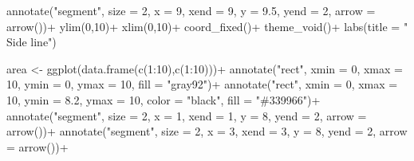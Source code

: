 \documentclass[
  letterpaper,
]{book}
\newenvironment{Shaded}{\begin{snugshade}}{\end{snugshade}}
\newcommand{\AttributeTok}[1]{\textcolor[rgb]{0.40,0.45,0.13}{#1}}
\newcommand{\DecValTok}[1]{\textcolor[rgb]{0.68,0.00,0.00}{#1}}
\newcommand{\FloatTok}[1]{\textcolor[rgb]{0.68,0.00,0.00}{#1}}
\newcommand{\FunctionTok}[1]{\textcolor[rgb]{0.28,0.35,0.67}{#1}}
\newcommand{\NormalTok}[1]{\textcolor[rgb]{0.00,0.23,0.31}{#1}}
\newcommand{\OtherTok}[1]{\textcolor[rgb]{0.00,0.23,0.31}{#1}}
\newcommand{\SpecialCharTok}[1]{\textcolor[rgb]{0.37,0.37,0.37}{#1}}
\newcommand{\StringTok}[1]{\textcolor[rgb]{0.13,0.47,0.30}{#1}}
\begin{document}
\begin{Shaded}
\begin{Highlighting}[]
  \FunctionTok{annotate}\NormalTok{(}\StringTok{"segment"}\NormalTok{, }\AttributeTok{size =} \DecValTok{2}\NormalTok{, }\AttributeTok{x =} \DecValTok{9}\NormalTok{, }\AttributeTok{xend =} \DecValTok{9}\NormalTok{, }\AttributeTok{y =} \FloatTok{9.5}\NormalTok{, }\AttributeTok{yend =} \DecValTok{2}\NormalTok{, }\AttributeTok{arrow =} \FunctionTok{arrow}\NormalTok{())}\SpecialCharTok{+}
  \FunctionTok{ylim}\NormalTok{(}\DecValTok{0}\NormalTok{,}\DecValTok{10}\NormalTok{)}\SpecialCharTok{+}
  \FunctionTok{xlim}\NormalTok{(}\DecValTok{0}\NormalTok{,}\DecValTok{10}\NormalTok{)}\SpecialCharTok{+}
  \FunctionTok{coord\_fixed}\NormalTok{()}\SpecialCharTok{+}
  \FunctionTok{theme\_void}\NormalTok{()}\SpecialCharTok{+}
  \FunctionTok{labs}\NormalTok{(}\AttributeTok{title =} \StringTok{"      Side line"}\NormalTok{)}

\NormalTok{area }\OtherTok{\textless{}{-}} \FunctionTok{ggplot}\NormalTok{(}\FunctionTok{data.frame}\NormalTok{(}\FunctionTok{c}\NormalTok{(}\DecValTok{1}\SpecialCharTok{:}\DecValTok{10}\NormalTok{),}\FunctionTok{c}\NormalTok{(}\DecValTok{1}\SpecialCharTok{:}\DecValTok{10}\NormalTok{)))}\SpecialCharTok{+}
  \FunctionTok{annotate}\NormalTok{(}\StringTok{"rect"}\NormalTok{, }\AttributeTok{xmin =} \DecValTok{0}\NormalTok{, }\AttributeTok{xmax =} \DecValTok{10}\NormalTok{, }\AttributeTok{ymin =} \DecValTok{0}\NormalTok{, }\AttributeTok{ymax =} \DecValTok{10}\NormalTok{, }\AttributeTok{fill =} \StringTok{"gray92"}\NormalTok{)}\SpecialCharTok{+}
  \FunctionTok{annotate}\NormalTok{(}\StringTok{"rect"}\NormalTok{, }\AttributeTok{xmin =} \DecValTok{0}\NormalTok{, }\AttributeTok{xmax =} \DecValTok{10}\NormalTok{, }\AttributeTok{ymin =} \FloatTok{8.2}\NormalTok{, }\AttributeTok{ymax =} \DecValTok{10}\NormalTok{, }\AttributeTok{color =} \StringTok{"black"}\NormalTok{, }\AttributeTok{fill =} \StringTok{"\#339966"}\NormalTok{)}\SpecialCharTok{+}
  \FunctionTok{annotate}\NormalTok{(}\StringTok{"segment"}\NormalTok{, }\AttributeTok{size =} \DecValTok{2}\NormalTok{, }\AttributeTok{x =} \DecValTok{1}\NormalTok{, }\AttributeTok{xend =} \DecValTok{1}\NormalTok{, }\AttributeTok{y =} \DecValTok{8}\NormalTok{, }\AttributeTok{yend =} \DecValTok{2}\NormalTok{, }\AttributeTok{arrow =} \FunctionTok{arrow}\NormalTok{())}\SpecialCharTok{+}
  \FunctionTok{annotate}\NormalTok{(}\StringTok{"segment"}\NormalTok{, }\AttributeTok{size =} \DecValTok{2}\NormalTok{, }\AttributeTok{x =} \DecValTok{3}\NormalTok{, }\AttributeTok{xend =} \DecValTok{3}\NormalTok{, }\AttributeTok{y =} \DecValTok{8}\NormalTok{, }\AttributeTok{yend =} \DecValTok{2}\NormalTok{, }\AttributeTok{arrow =} \FunctionTok{arrow}\NormalTok{())}\SpecialCharTok{+}

\end{Highlighting}
\end{Shaded}
\end{document}
